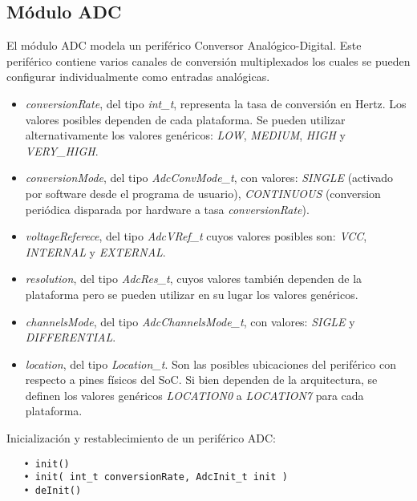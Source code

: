 \subsection{Módulo ADC}

El módulo ADC modela un periférico Conversor Analógico-Digital. Este periférico contiene varios canales de conversión multiplexados los cuales se pueden configurar individualmente como entradas analógicas.


\begin{itemize}
\item
\emph{conversionRate}, del tipo \emph{int\_t}, representa la tasa de conversión en Hertz. Los valores posibles dependen de cada plataforma. Se pueden utilizar alternativamente los valores genéricos: \emph{LOW}, \emph{MEDIUM}, \emph{HIGH} y \emph{VERY\_HIGH}.
\item
\emph{conversionMode}, del tipo \emph{AdcConvMode\_t}, con valores: \emph{SINGLE} (activado por software desde el programa de usuario), \emph{CONTINUOUS} (conversion periódica disparada por hardware a tasa \emph{conversionRate}).%
\item
\emph{voltageReferece}, del tipo \emph{AdcVRef\_t} cuyos valores posibles son: \emph{VCC}, \emph{INTERNAL} y \emph{EXTERNAL}.
\item
\emph{resolution}, del tipo \emph{AdcRes\_t}, cuyos valores también dependen de la plataforma pero se pueden utilizar en su lugar los valores genéricos.
\item
\emph{channelsMode}, del tipo \emph{AdcChannelsMode\_t}, con valores: \emph{SIGLE} y \emph{DIFFERENTIAL}.
\item
\emph{location}, del tipo \emph{Location\_t}. Son las posibles ubicaciones del periférico con respecto a pines físicos del SoC. Si bien dependen de la arquitectura, se definen los valores genéricos \emph{LOCATION0} a \emph{LOCATION7} para cada plataforma.
\end{itemize}


Inicialización y restablecimiento de un periférico ADC:

\begin{verbatim}
   • init()
   • init( int_t conversionRate, AdcInit_t init )
   • deInit()
\end{verbatim}

